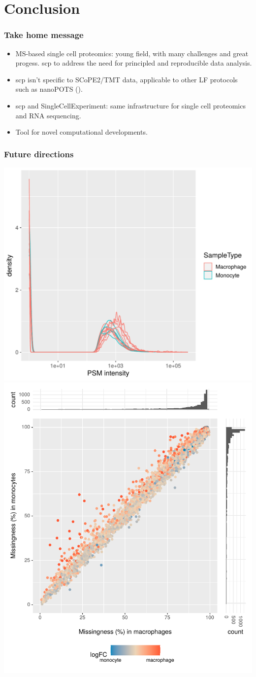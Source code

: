 \documentclass{beamer}
\newcommand{\hcode}[2][lgray]{{\ttfamily\color{vdgray}\colorbox{#1}{#2}}}
\newcommand{\frametitlesection}[1]{\frametitle{\centering #1 \footnotesize \hspace{0pt plus 1 filll} \insertsection}}
\begin{document}

\section{Conclusion}


\begin{frame}
  \frametitlesection{Take home message}  
  \begin{itemize}
  \item MS-based single cell proteomics: young field, with many
    challenges and great progess. \hcode{scp} to address the need for
    principled and reproducible data analysis.
  \item \hcode{scp} isn't specific to SCoPE2/TMT data, applicable to
    other LF protocols such as nanoPOTS (\citet{Williams2020-nv,Cong2020-kh}).
  \item \hcode{scp} and \hcode{SingleCellExperiment}: same
    infrastructure for single cell proteomics and RNA sequencing.
  \item Tool for novel computational developments.
    
  \end{itemize}
\end{frame}

\begin{frame}
    \frametitlesection{Future directions}
    \includegraphics[width=.5\linewidth]{figs/PSM_intensity.pdf}
    \includegraphics[width=.4\linewidth]{figs/missingness.pdf}

\end{frame}
\end{document}
